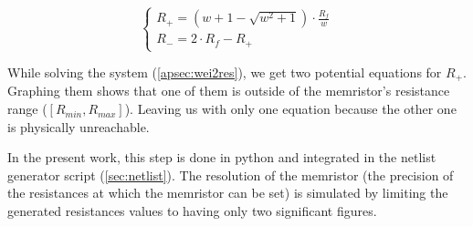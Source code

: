 \begin{equation}
  \label{eq:wei2res2}
  \begin{cases}
    R_+= (w+1-\sqrt{w^2+1})\cdot\frac{R_f}{w}\\
    R_-=2\cdot R_f -R_+
  \end{cases}
\end{equation}

While solving the system (\cref{apsec:wei2res}), we get two potential equations for $R_+$. Graphing them shows that one of them is outside of the memristor's resistance range ($[R_{min},R_{max}]$). Leaving us with only one equation because the other one is physically unreachable.

In the present work, this step is done in python and integrated in the netlist generator script (\cref{sec:netlist}). The resolution of the memristor (the precision of the resistances at which the memristor can be set) is simulated by limiting the generated resistances values to having only two significant figures.
